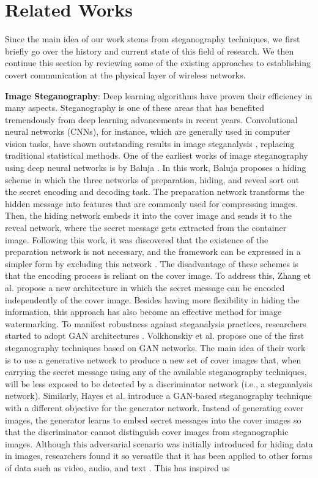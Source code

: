 \section{Related Works}
\label{s:related}
Since the main idea of our work stems from steganography techniques, we first briefly go over the history and current state of this field of research. We then continue this section by reviewing some of the existing approaches to establishing covert communication at the physical layer of wireless networks.

\textbf{Image Steganography}: Deep learning algorithms have proven their efficiency in many aspects. Steganography is one of these areas that has benefited tremendously from deep learning advancements in recent years. Convolutional neural networks (CNNs), for instance, which are generally used in computer vision tasks, have shown outstanding results in image steganalysis \cite{tan2014stacked,qian2015deep,xu2016structural}, replacing traditional statistical methods. One of the earliest works of image steganography using deep neural networks is by Baluja \cite{baluja2017hiding}. In this work, Baluja proposes a hiding scheme in which the three networks of preparation, hiding, and reveal sort out the secret encoding and decoding task. The preparation network transforms the hidden message into features that are commonly used for compressing images. Then, the hiding network embeds it into the cover image and sends it to the reveal network, where the secret message gets extracted from the container image. Following this work, it was discovered that the existence of the preparation network is not necessary, and the framework can be expressed in a simpler form by excluding this network \cite{zhang2021brief}. The disadvantage of these schemes is that the encoding process is reliant on the cover image. To address this, Zhang et al. \cite{zhang2020udh} propose a new architecture in which the secret message can be encoded independently of the cover image. Besides having more flexibility in hiding the information, this approach has also become an effective method for image watermarking. To manifest robustness against steganalysis practices, researchers started to adopt GAN architectures \cite{goodfellow2014generative}. Volkhonskiy et al. \cite{volkhonskiy2020steganographic} propose one of the first steganography techniques based on GAN networks. The main idea of their work is to use a generative network to produce a new set of cover images that, when carrying the secret message using any of the available steganography techniques, will be less exposed to be detected by a discriminator network (i.e., a steganalysis network). Similarly, Hayes et al. \cite{hayes2017generating} introduce a GAN-based steganography technique with a different objective for the generator network. Instead of generating cover images, the generator learns to embed secret messages into the cover images so that the discriminator cannot distinguish cover images from steganographic images. Although this adversarial scenario was initially introduced for hiding data in images, researchers found it so versatile that it has been applied to other forms of data such as video, audio, and text \cite{martin2023evolving}. This has inspired us 